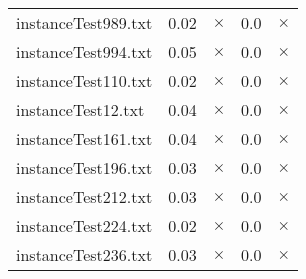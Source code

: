 \documentclass{article}
\begin{document}
\begin{center}
\begin{tabular}{lrrrr}
instanceTest989.txt & 0.02 & 
$\times$
 & 0.0 & 
$\times$
\\
instanceTest994.txt & 0.05 & 
$\times$
 & 0.0 & 
$\times$
\\
instanceTest110.txt & 0.02 & 
$\times$
 & 0.0 & 
$\times$
\\
instanceTest12.txt & 0.04 & 
$\times$
 & 0.0 & 
$\times$
\\
instanceTest161.txt & 0.04 & 
$\times$
 & 0.0 & 
$\times$
\\
instanceTest196.txt & 0.03 & 
$\times$
 & 0.0 & 
$\times$
\\
instanceTest212.txt & 0.03 & 
$\times$
 & 0.0 & 
$\times$
\\
instanceTest224.txt & 0.02 & 
$\times$
 & 0.0 & 
$\times$
\\
instanceTest236.txt & 0.03 & 
$\times$
 & 0.0 & 
$\times$
\\
\hline\end{tabular}
\end{center}
\end{document}
